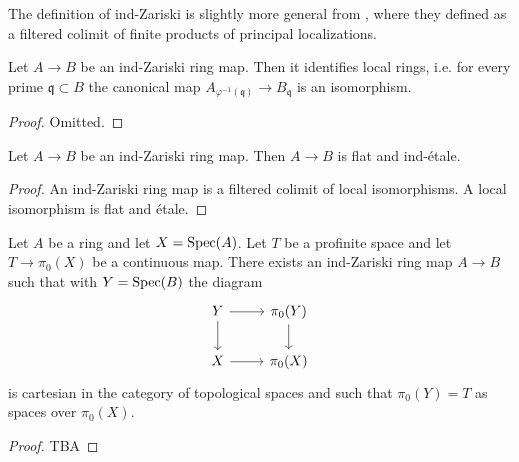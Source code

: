 \begin{remark}
  The definition of ind-Zariski is slightly more general from \cite[Definition 2.2.1(iv)]{proetale}, where they defined as a filtered colimit of finite products of principal localizations. 
\end{remark}

\begin{lemma}
  Let $A \to B$ be an ind-Zariski ring map. Then it identifies local rings, i.e. for every prime $\mathfrak{q} \subset B$ the canonical map $A_{\varphi^{-1}(\mathfrak{q})} \to B_{\mathfrak{q}}$ is an isomorphism.
  \label{thm:ind-Zariski-identifies-local-rings}
\end{lemma}

\begin{proof}
  Omitted.
\end{proof}

\begin{lemma}
  Let $A \to B$ be an ind-Zariski ring map. Then $A \to B$ is flat and ind-étale.
  \label{thm:ind-Zariski-is-flat-ind-etale}
\end{lemma}

\begin{proof}
  An ind-Zariski ring map is a filtered colimit of local isomorphisms. A local isomorphism is flat and étale.
\end{proof}

\begin{lemma}
Let $A$ be a ring and let $X = \operatorname{Spec} (A)$. Let $T$ be a profinite space and let $T \to \pi_0(X)$ be a continuous map. There exists an ind-Zariski ring map $A \to B$ such that with $Y = \operatorname{Spec} (B)$ the diagram
\[
\begin{tikzcd}
Y \arrow[r] \arrow[d] & \pi_0(Y) \arrow[d] \\
X \arrow[r] & \pi_0(X)
\end{tikzcd}
\]
is cartesian in the category of topological spaces and such that $\pi_0(Y) = T$ as spaces over $\pi_0(X)$.
\label{thm:exists-ind-Zariski-cartesian}
\end{lemma}

\begin{proof}
  TBA
\end{proof}

